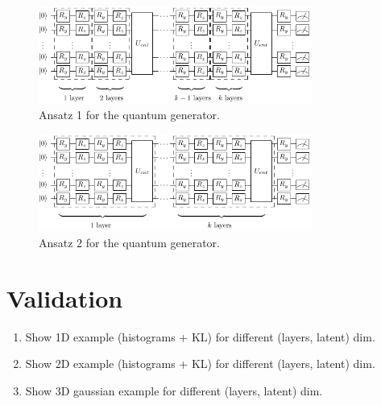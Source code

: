 \documentclass[twocolumn,preprintnumbers,superscriptaddress]{revtex4-2}
\begin{document}
\begin{figure}
  \includegraphics[width=0.8\textwidth]{plots/ansatz1.pdf}
  \caption{\label{fig:circuit}Ansatz 1 for the quantum generator.}
\end{figure}

\begin{figure}
  \includegraphics[width=0.8\textwidth]{plots/ansatz2.pdf}
  \caption{\label{fig:circuit}Ansatz 2 for the quantum generator.}
\end{figure}

\section{Validation}
\label{sec:validation}

\begin{enumerate}
  \item Show 1D example (histograms + KL) for different (layers, latent) dim.
  \item Show 2D example (histograms + KL) for different (layers, latent) dim.
  \item Show 3D gaussian example for different (layers, latent) dim.
\end{enumerate}
\end{document}
